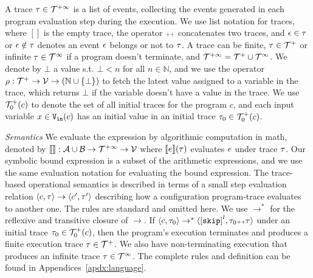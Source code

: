 A trace $\mathtt{\tau} \in \mathcal{T}^{+\infty}$ is a list of events, 
collecting the events generated in each program evaluation step during the execution. 
We use list notation for traces, where $[]$ is the empty trace,
the operator ${\scriptscriptstyle ++}$ concatenates two traces, and $\mathtt{\epsilon} \in \mathtt{\tau}$ or $\mathtt{\epsilon} \notin \mathtt{\tau}$ denotes an event $\mathtt{\epsilon}$ belongs or not to $\mathtt{\tau}$.
{
A trace can be finite, $\mathtt{\tau} \in \mathcal{T}^{+}$ or infinite $\mathtt{\tau} \in \mathcal{T}^{\infty}$ if a program doesn't terminate,
and $\mathcal{T}^{+\infty} = \mathcal{T}^{+} \cup \mathcal{T}^{\infty}$.
}
We denote by $\bot$ a value s.t. $\bot < n $ for all $n \in \mathbb{N}$, and we use the operator $\rho: {\mathcal{T}^{+}} \to \mathcal{V} \to(\mathbb{N} \cup \{\bot\})$ to fetch the latest value assigned to a variable in the trace, which returns $\bot$ if the variable doesn't have a value in the trace.
We use $\mathcal{T}^{+}_0(c)$ to denote the set of all initial traces for the program $c$, and each input variable $x \in {\ensuremath{\mathtt{V_{\mathtt{in}}}}}(c)$ has an initial value in an initial trace $\mathtt{\tau}_0 \in \mathcal{T}^{+}_0(c)$.

\emph{Semantics}
We evaluate the expression by algorithmic computation in math, denoted by
$\llbracket  \rrbracket : \mathcal{A} \cup \mathcal{B} \to \mathcal{T}^{+\infty} \to \mathcal{V}$ where
$\llbracket e \rrbracket(\mathtt{\tau})$ evaluates $e$ under trace $\mathtt{\tau}$.
Our symbolic bound expression is a subset of the arithmetic expressions, and we use the same evaluation notation for evaluating the bound expression.
The trace-based operational semantics is described in terms of a small step evaluation relation $\langle c, \mathtt{\tau} \rangle \to \langle c', \mathtt{\tau}' \rangle$ describing how a configuration program-trace evaluates to another
one.
The rules are standard and omitted here.
We use $\to^*$ for the reflexive and transitive closure of $\to$. 
If $\config{c, \trace_0} \rightarrow^{*} \config{\clabel{\eskip}^l, \trace_0 \tracecat \trace}$ under an initial trace 
$\mathtt{\tau}_0 \in \mathcal{T}^{+}_0(c)$,
then the program's execution terminates and produces a finite execution trace $\mathtt{\tau} \in \mathcal{T}^{+}$. We also have non-terminating execution that produces an infinite trace $\mathtt{\tau} \in \mathcal{T}^{\infty}$. The complete rules and definition can be found in Appendices~\ref{apdx:language}.